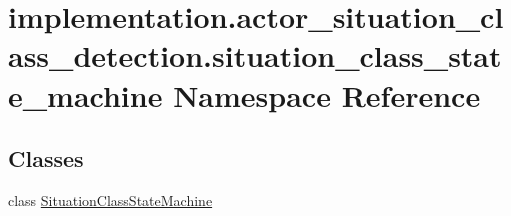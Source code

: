 \hypertarget{namespaceimplementation_1_1actor__situation__class__detection_1_1situation__class__state__machine}{}\section{implementation.\+actor\+\_\+situation\+\_\+class\+\_\+detection.\+situation\+\_\+class\+\_\+state\+\_\+machine Namespace Reference}
\label{namespaceimplementation_1_1actor__situation__class__detection_1_1situation__class__state__machine}
\subsection*{Classes}
\begin{DoxyCompactItemize}
\item 
class \hyperlink{classimplementation_1_1actor__situation__class__detection_1_1situation__class__state__machine_1_1_situation_class_state_machine}{Situation\+Class\+State\+Machine}
\end{DoxyCompactItemize}
